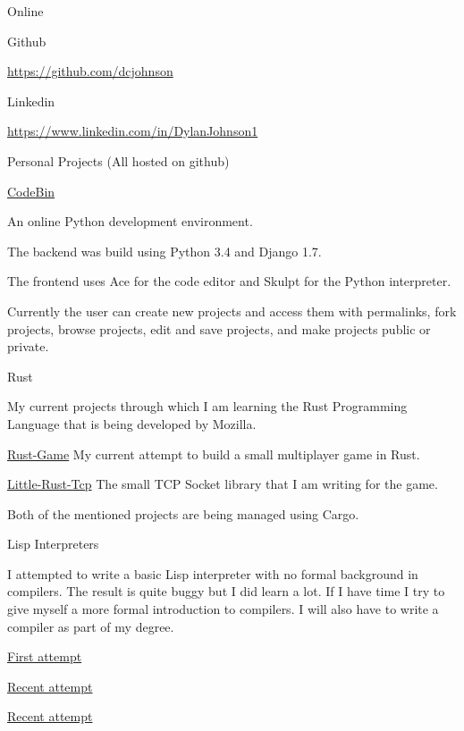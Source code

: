 \documentclass{resume} %
\begin{document}
\begin{rSection}{Online}

\begin{rSubsection}{Github}{}{}{}
	\item {\href{https://github.com/dcjohnson}{https://github.com/dcjohnson}}
\end{rSubsection}

\begin{rSubsection}{Linkedin}{}{}{}
	\item {\href{https://www.linkedin.com/in/DylanJohnson1}{https://www.linkedin.com/in/DylanJohnson1}}
\end{rSubsection}

\end{rSection}

\begin{rSection}{Personal Projects (All hosted on github)}

\begin{rSubsection}{\href{https://github.com/dcjohnson/CodeBin}{CodeBin}}{}{}{}
	\item An online Python development environment.
	\item The backend was build using Python 3.4 and Django 1.7.
	\item The frontend uses Ace for the code editor and Skulpt for the Python interpreter.
	\item Currently the user can create new projects and access them with permalinks, fork projects, browse projects, edit and save projects, and make projects public or private.
\end{rSubsection}

\begin{rSubsection}{Rust}{}{}{}
	\item My current projects through which I am learning the Rust Programming Language that is being developed by Mozilla.
	\item {\href{https://github.com/dcjohnson/Rust-Game}{Rust-Game}} My current attempt to build a small multiplayer game in Rust.
	\item {\href{https://github.com/dcjohnson/Little-Rust-Tcp}{Little-Rust-Tcp}} The small TCP Socket library that I am writing for the game.
	\item Both of the mentioned projects are being managed using Cargo.
\end{rSubsection}

\begin{rSubsection}{Lisp Interpreters}{}{}{}
	\item I attempted to write a basic Lisp interpreter with no formal background in compilers. The result is quite buggy but I did learn a lot. If I have time I try to give myself a more formal introduction to compilers. I will also have to write a compiler as part of my degree.
	\item {\href{https://github.com/dcjohnson/hackit}{First attempt}}
	\item {\href{https://github.com/dcjohnson/hackit-v2}{Recent attempt}}
	\item {\href{https://github.com/dcjohnson/libhackit-v2}{Recent attempt}}
\end{rSubsection}


\end{rSection}
\end{document}
